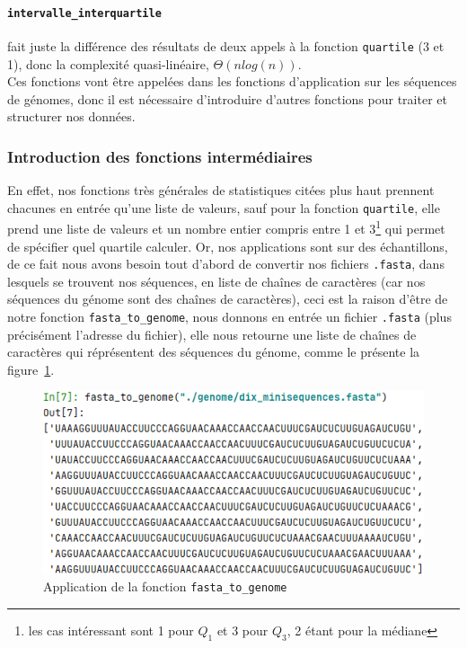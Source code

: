 \documentclass[12pt]{article}
\begin{document}
\paragraph{\texttt{intervalle\_interquartile}} fait juste la différence des résultats de deux appels à la fonction \texttt{quartile} (3 et 1), donc la complexité quasi-linéaire, $\Theta(nlog(n))$.\\

Ces fonctions vont être appelées dans les fonctions d'application sur les séquences de génomes, donc il est nécessaire d'introduire d'autres fonctions pour traiter et structurer nos données.



\subsubsection{Introduction des fonctions intermédiaires}
En effet, nos fonctions très générales de statistiques citées plus haut prennent chacunes en entrée qu'une liste de valeurs, sauf pour la fonction \texttt{quartile}, elle prend une liste de valeurs et un nombre entier compris entre 1 et 3\footnote{les cas intéressant sont 1 pour $Q_1$ et 3 pour $Q_3$, 2 étant pour la médiane} qui permet de spécifier quel quartile calculer. Or, nos applications sont sur des échantillons, de ce fait nous avons besoin tout d'abord de convertir nos fichiers \texttt{.fasta}, dans lesquels se trouvent nos séquences, en liste de chaînes de caractères (car nos séquences du génome sont des chaînes de caractères), ceci est la raison d'être de notre fonction \texttt{fasta\_to\_genome}, nous donnons en entrée un fichier \texttt{.fasta} (plus précisément l'adresse du fichier), elle nous retourne une liste de chaînes de caractères qui réprésentent des séquences du génome, comme le présente la figure~\ref{appfasta}. 
    \begin{figure}[!h]
        \centering
        \includegraphics[scale = 0.85]{Images/Stats/app_fasta_to_genome.PNG}
        \caption{Application de la fonction \texttt{fasta\_to\_genome}}
        \label{appfasta}
    \end{figure}
\end{document}
